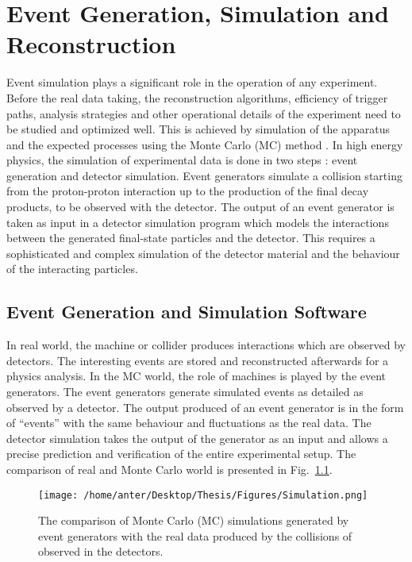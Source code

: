 \chapter{Event Generation, Simulation and Reconstruction}
\label{chap:Reconstruction}
Event simulation plays a significant role in the operation of any experiment. Before the real data taking, the reconstruction algorithms, efficiency of trigger paths, analysis strategies and other operational details of the experiment need to be studied and optimized well. This is achieved by simulation of the apparatus and the expected processes using the Monte Carlo (MC) method \cite{Monte}. In high energy physics, the simulation of experimental data is done in two steps : event generation and detector simulation. Event generators simulate a collision starting from the proton-proton interaction up to the production of the final decay products, to be observed with the detector. The output of an event generator is taken as input in a detector simulation program which models the interactions between the generated final-state particles and the detector. This requires a sophisticated and complex simulation of the detector material and the behaviour of the interacting particles.

\section{Event Generation and Simulation Software}
In real world, the machine or collider produces interactions which are observed by detectors. The interesting events are stored and reconstructed afterwards for a physics analysis. In the MC world, the role of machines is played by the event generators. The event generators generate simulated events as detailed as observed by a detector. The output produced of an event generator is in the form of ``events'' with the same behaviour and fluctuations as the real data. The detector simulation takes the output of the generator as an input and allows a precise prediction and verification of the entire experimental setup. The comparison of real and Monte Carlo world is presented in Fig.~\ref{fig:sim}. %

\begin{figure}[h!]
\begin{center}
\vspace*{2mm} 
\texttt{[image: /home/anter/Desktop/Thesis/Figures/Simulation.png]}\\
\vspace*{4mm} 
\caption{The comparison of Monte Carlo (MC) simulations generated by event generators with the real data produced by the collisions of observed in the detectors.}
\label{fig:sim}
\end{center}
\end{figure}

